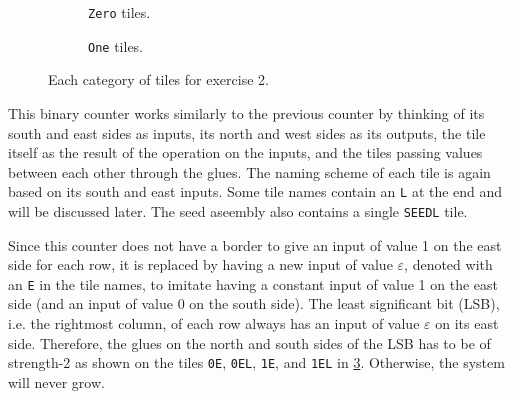 \documentclass[11pt]{article}
\begin{document}
\begin{figure}[htbp]
    \centering
    \begin{subfigure}{\textwidth}
        \centering
        
        
        
        
        
        
        \caption{\texttt{Zero} tiles.}
        \label{fig:exs-2_zero}
    \end{subfigure}
    \begin{subfigure}{\textwidth}
        \centering
        
        
        
        
        
        
        \caption{\texttt{One} tiles.}
        \label{fig:exs-2_one}
    \end{subfigure}
    \caption{Each category of tiles for exercise 2.}
    \label{fig:exs-2}
\end{figure}

This binary counter works similarly to the previous counter by thinking of its south and east sides
as inputs, its north and west sides as its outputs, the tile itself as the result of the operation
on the inputs, and the tiles passing values between each other through the glues. The naming scheme
of each tile is again based on its south and east inputs. Some tile names contain an \verb|L| at the
end and will be discussed later. The seed aseembly also contains a single \verb|SEEDL| tile.

Since this counter does not have a border to give an input of value 1 on the east side for each row,
it is replaced by having a new input of value $\varepsilon$, denoted with an \verb|E| in the tile
names, to imitate having a constant input of value 1 on the east side (and an input of value 0 on
the south side). The least significant bit (LSB), i.e. the rightmost column, of each row always has
an input of value $\varepsilon$ on its east side. Therefore, the glues on the north and south sides
of the LSB has to be of strength-2 as shown on the tiles \verb|0E|, \verb|0EL|, \verb|1E|, and
\verb|1EL| in \cref{fig:exs-2}. Otherwise, the system will never grow.
\end{document}
